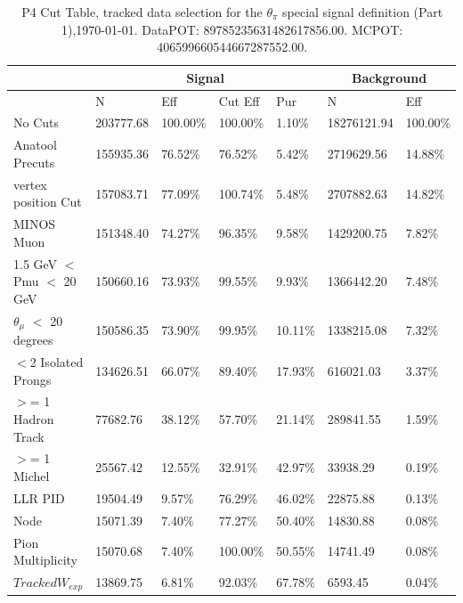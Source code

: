 \begin{table}[!hbt]
    \tiny
    \centering
    \begin{tabular}{|*{7}{l|}}


    \hline
    & \multicolumn{4}{c|}{Signal} & \multicolumn{2}{c|}{Background} \\
    \hline

   & N     & Eff     & Cut Eff & Pur    & N         & Eff   \\\hline
  No Cuts   & 203777.68     & 100.00\% & 100.00\% &   1.10\% & 18276121.94 & 100.00\% \\ \hline
  Anatool Precuts   & 155935.36     &  76.52\% &  76.52\% &   5.42\% & 2719629.56 &  14.88\% \\ \hline
  vertex position Cut   & 157083.71     &  77.09\% & 100.74\% &   5.48\% & 2707882.63 &  14.82\% \\ \hline
  MINOS Muon   & 151348.40     &  74.27\% &  96.35\% &   9.58\% & 1429200.75 &   7.82\%  \\ \hline
  1.5 GeV $<$ Pmu $<$ 20 GeV   & 150660.16     &  73.93\% &  99.55\% &   9.93\% & 1366442.20 &   7.48\% \\ \hline
  $\theta_{\mu}$ $<$ 20 degrees   & 150586.35     &  73.90\% &  99.95\% &  10.11\% & 1338215.08 &   7.32\%  \\ \hline
  $<$2 Isolated Prongs   & 134626.51     &  66.07\% &  89.40\% &  17.93\% & 616021.03 &   3.37\%  \\ \hline
  $>$= 1 Hadron Track   & 77682.76     &  38.12\% &  57.70\% &  21.14\% & 289841.55 &   1.59\% \\ \hline
  $>$= 1 Michel   & 25567.42     &  12.55\% &  32.91\% &  42.97\% & 33938.29 &   0.19\% \\ \hline
  LLR PID   & 19504.49     &   9.57\% &  76.29\% &  46.02\% & 22875.88 &   0.13\% \\ \hline
  Node   & 15071.39     &   7.40\% &  77.27\% &  50.40\% & 14830.88 &   0.08\% \\ \hline
  Pion Multiplicity   & 15070.68     &   7.40\% & 100.00\% &  50.55\% & 14741.49 &   0.08\% \\ \hline 
  $Tracked W_{exp}$   & 13869.75     &   6.81\% &  92.03\% &  67.78\% & 6593.45 &   0.04\% \\ \hline
  
    \end{tabular}
    \caption{P4 Cut Table, tracked data selection for the $\theta_\pi$ special signal definition (Part 1),\today. DataPOT: 89785235631482617856.00. MCPOT: 406599660544667287552.00.}
    \label{tab:Analysis:Cuts:TrackedCutTableThetapi1}
\end{table}

